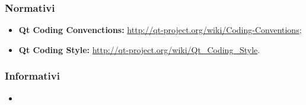 \subsubsection{Normativi}
\label{rnormativi}
\begin{itemize}
\item \textbf{Qt Coding Convenctions:} \url{http://qt-project.org/wiki/Coding-Conventions};
\item \textbf{Qt Coding Style:} \url{http://qt-project.org/wiki/Qt_Coding_Style}.
\end{itemize}

\subsubsection{Informativi}
\label{rinformativi}
\begin{itemize}
\item \PdP{}
\end{itemize}
